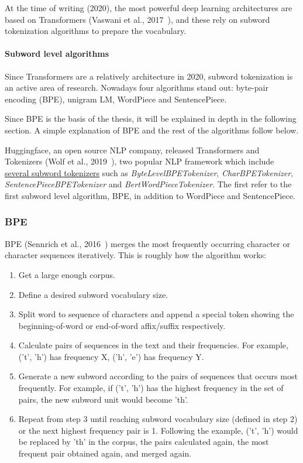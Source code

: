At the time of writing (2020), the most powerful deep learning architectures are based on Transformers (Vaswani et al., 2017~\cite{vaswani2017attention}), and these rely on subword tokenization algorithms to prepare the vocabulary.

\paragraph{Subword level algorithms}

Since Transformers are a relatively architecture in 2020, subword tokenization is an active area of research. Nowadays four algorithms stand out: byte-pair encoding (BPE), unigram LM, WordPiece and SentencePiece.

Since BPE is the basis of the thesis, it will be explained in depth in the following section. A simple explanation of BPE and the rest of the algorithms follow below.

Huggingface, an open source NLP company, released Transformers and Tokenizers (Wolf et al., 2019~\cite{wolf2019huggingfaces}), two popular NLP framework which include \href{https://github.com/huggingface/tokenizers/tree/74d812d40180032d2dbb6ca59e2e10f0257ef46b/bindings/python/tokenizers/implementations}{several subword tokenizers} such as \emph{ByteLevelBPETokenizer}, \emph{CharBPETokenizer}, \emph{SentencePieceBPETokenizer} and \emph{BertWordPieceTokenizer}. The first refer to the first subword level algorithm, BPE, in addition to WordPiece and SentencePiece.

\subsubsection{BPE}\label{subsubsec:bpe}

BPE (Sennrich et al., 2016~\cite{sennrich2015neural}) merges the most frequently occurring character or character sequences iteratively. This is roughly how the algorithm works:

\begin{enumerate}
    \item Get a large enough corpus.
    \item Define a desired subword vocabulary size.
    \item Split word to sequence of characters and append a special token showing the beginning-of-word or end-of-word affix/suffix respectively.
    \item Calculate pairs of sequences in the text and their frequencies. For example, ('t', 'h') has frequency X, ('h', 'e') has frequency Y.
    \item Generate a new subword according to the pairs of sequences that occurs most frequently. For example, if ('t', 'h') has the highest frequency in the set of pairs, the new subword unit would become 'th'.
    \item Repeat from step 3 until reaching subword vocabulary size (defined in step 2) or the next highest frequency pair is 1. Following the example, ('t', 'h') would be replaced by 'th' in the corpus, the pairs calculated again, the most frequent pair obtained again, and merged again.
\end{enumerate}

